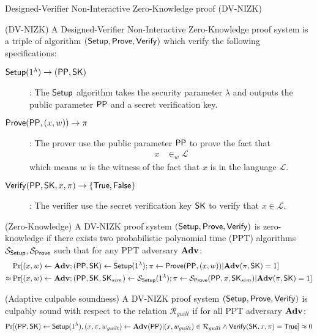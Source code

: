 \begin{subsection}{Designed-Verifier Non-Interactive Zero-Knowledge proof (DV-NIZK)}

  \begin{definition}{(DV-NIZK)} A Designed-Verifier Non-Interactive Zero-Knowledge proof system is a triple of algorithm $({\mathsf{Setup}}, {\mathsf{Prove}}, {\mathsf{Verify}})$ which verify the following specifications:
    \begin{description}
    \item[${\mathsf{Setup}}(1^\lambda) \to ({\mathsf{PP}}, \mathsf{SK})$]: The ${\mathsf{Setup}}$ algorithm takes the security parameter $\lambda$ and outputs the public parameter ${\mathsf{PP}}$ and a secret verification key.
    \item[${\mathsf{Prove}}({\mathsf{PP}}, (x, w)) \to \pi$]: The prover use the public parameter ${\mathsf{PP}}$ to prove the fact that
      \begin{align*}
        x &\in_w \mathcal{L}
      \end{align*}
      which means $w$ is the witness of the fact that $x$ is in the language $\mathcal{L}$.
    \item[${\mathsf{Verify}}({\mathsf{PP}}, \mathsf{SK}, x, \pi) \to \{\mathsf{True}, \mathsf{False}\}$]: The verifier use the secret verification key $\mathsf{SK}$ to verify that $x \in \mathcal{L}$. 
    \end{description}
  \end{definition}

  \begin{definition}{(Zero-Knowledge)}
    A DV-NIZK proof system $({\mathsf{Setup}}, {\mathsf{Prove}}, {\mathsf{Verify}})$ is zero-knowledge if there exists two probabilistic polynomial time (PPT) algorithms $\mathcal{S}_{{\mathsf{Setup}}}, \mathcal{S}_{{\mathsf{Prove}}}$ such that for any PPT adversary $\mathbf{Adv}$:
    \begin{align*}
      &\Pr[(x, w) \gets \mathbf{Adv}; ({\mathsf{PP}},\mathsf{SK}) \gets {\mathsf{Setup}}(1^\lambda); \pi \gets {\mathsf{Prove}}({\mathsf{PP}}, (x,w)) | \mathbf{Adv}(\pi, \mathsf{SK}) = 1]\\
      \approx &\Pr[(x, w) \gets \mathbf{Adv}; ({\mathsf{PP}},\mathsf{SK}, \mathsf{SK}_{sim}) \gets \mathcal{S}_{{\mathsf{Setup}}}(1^\lambda); \pi \gets \mathcal{S}_{{\mathsf{Prove}}}({\mathsf{PP}}, x, \mathsf{SK}_{sim}) | \mathbf{Adv}(\pi, \mathsf{SK}) = 1]
    \end{align*}
  \end{definition}



  \begin{definition}{(Adaptive culpable soundness)}
    A DV-NIZK proof system $({\mathsf{Setup}}, {\mathsf{Prove}}, {\mathsf{Verify}})$ is culpably sound with respect to the relation $\mathcal{R}_{guilt}$ if for all PPT adversary $\mathbf{Adv}$:
    \begin{align*}
      \Pr[({\mathsf{PP}}, \mathsf{SK}) \gets {\mathsf{Setup}}(1^{\lambda}), (x, \pi, w_{guilt}) \gets \mathbf{Adv}({\mathsf{PP}}) | (x, w_{guilt}) \in \mathcal{R}_{guilt} \wedge {\mathsf{Verify}}(\mathsf{SK}, x, \pi) = \mathsf{True}] \approx 0
    \end{align*}
  \end{definition}

  
\end{subsection}
